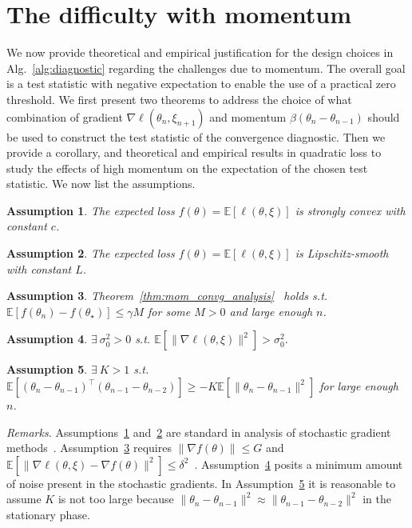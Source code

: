 \documentclass[conference]{IEEEtran}
\newcommand{\Ex}[1]{\mathbb{E}[ #1 ]}
\newtheorem{assumption}{Assumption}
\begin{document}
\section{The difficulty with momentum}\label{sec:momentum-stationarity}

We now provide theoretical and empirical justification for the design choices in Alg.~\ref{alg:diagnostic} regarding the challenges due to momentum.
The overall goal is a test statistic with negative expectation to enable the use of a practical zero threshold. We first present two theorems to address the choice of what combination of gradient $\nabla \ell (\theta_n, \xi_{n+1})$ and momentum $\beta (\theta_n - \theta_{n-1})$ should be used to construct the test statistic of the convergence diagnostic. Then we provide a corollary, and theoretical and empirical results in quadratic loss to study the effects of high momentum on the expectation of the chosen test statistic.
We now list the assumptions.
\begin{assumption}
\label{assump:strcvx}
The expected loss $f(\theta) = \Ex{ \ell(\theta, \xi) }$ is strongly convex with constant $c$.
\end{assumption}

\begin{assumption}
\label{assump:Lsmooth}
The expected loss $f(\theta) = \Ex{ \ell(\theta, \xi) }$ is Lipschitz-smooth with constant $L$.
\end{assumption}

\begin{assumption}
\label{assump:Fbound}
Theorem~\ref{thm:mom_convg_analysis}~\cite{Report:Yang_arXiv16} holds s.t. $\Ex{ f(\theta_n) - f(\theta_\star) } \leq \gamma M$ for some $M > 0$ and large enough $n$. 
\end{assumption}

\begin{assumption}
\label{assump:min_noise} 
$\exists \ \sigma_0^2 > 0$ s.t. $\Ex{ \| \nabla \ell (\theta, \xi) \|^2 } > \sigma_0^2$.
\end{assumption}

\begin{assumption}
\label{assump:scaling}
$\exists \ K > 1$ s.t. $\Ex{ (\theta_n - \theta_{n-1})^\top (\theta_{n-1} - \theta_{n-2}) } \geq - K \Ex{ \| \theta_n - \theta_{n-1} \|^2 }$ for large enough $n$.
\end{assumption}

\emph{Remarks.}
Assumptions~\ref{assump:strcvx} and~\ref{assump:Lsmooth} are standard in analysis of stochastic gradient methods~\cite{Bach_NIPS13,Proc:Bach_NIPS11}. 
Assumption~\ref{assump:Fbound} requires $\| \nabla f(\theta) \| \leq G$ and $\Ex{ \| \nabla \ell(\theta, \xi) - \nabla f(\theta) \|^2 } \leq \delta^2$~\cite{Report:Yang_arXiv16}. 
Assumption~\ref{assump:min_noise} posits a minimum amount of noise present in the stochastic gradients.
In Assumption~\ref{assump:scaling} it is reasonable to assume $K$ is not too large because $\| \theta_n - \theta_{n-1} \|^2 \approx \| \theta_{n-1} - \theta_{n-2} \|^2$ in the stationary phase.
\end{document}
